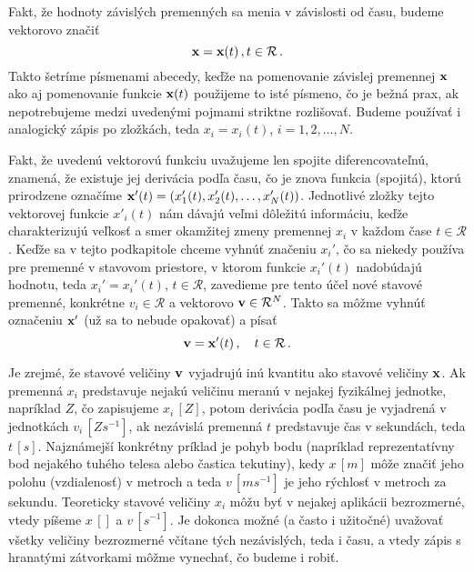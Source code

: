 Fakt, že hodnoty závislých premenných sa menia v závislosti od času, budeme vektorovo značiť
$$
{\bf x} = {\bf x}(t) \,, t \in \mathcal{R} \,.
$$
Takto šetríme písmenami abecedy, keďže na pomenovanie závislej premennej ${\bf x}$ ako aj pomenovanie funkcie ${\bf x}(t)$ použijeme to isté písmeno, čo je bežná prax, ak nepotrebujeme medzi uvedenými pojmami striktne rozlišovať. Budeme používať i analogický zápis po zložkách, teda $x_i=x_i(t)$, $i=1,2,\ldots,N$.

Fakt, že uvedenú vektorovú funkciu uvažujeme len spojite diferencovateľnú, znamená, že existuje jej derivácia podľa času, čo je znova funkcia (spojitá), ktorú prirodzene označíme ${\bf x}'(t)=(x_1'(t),x_2'(t),\ldots,x_N'(t))$. Jednotlivé zložky tejto vektorovej funkcie $x'_i(t)$ nám dávajú veľmi dôležitú informáciu, keďže charakterizujú veľkosť a smer okamžitej zmeny premennej $x_i$ v každom čase $t \in \mathcal{R}$. Keďže sa v tejto podkapitole chceme vyhnúť značeniu $x_i'$, čo sa niekedy používa pre premenné v stavovom priestore, v ktorom funkcie $x_i'(t)$ nadobúdajú hodnotu, teda $x_i'=x_i'(t)$, $t \in {\mathcal R}$, zavedieme pre tento účel nové stavové premenné, konkrétne $v_i \in {\mathcal R}$ a vektorovo ${\bf v} \in {\mathcal R}^N$. Takto sa môžme vyhnúť označeniu ${\bf x}'$ (už sa to nebude opakovať) a písať
\begin{equation}
\label{v=x}
{\bf v}  = {\bf x}'(t) \,, \quad t \in \mathcal{R} \,.
\end{equation}

Je zrejmé, že stavové veličiny ${\bf v}$ vyjadrujú inú kvantitu ako stavové veličiny $\bf x$.
Ak premenná $x_i$ predstavuje nejakú veličinu meranú v nejakej fyzikálnej jednotke, napríklad $Z$, čo zapisujeme $x_i \, [Z]$, potom derivácia podľa času je vyjadrená v jednotkách $v_i \, [Z s^{-1}]$, ak nezávislá premenná $t$ predstavuje čas v sekundách, teda $t \,[s]$.  Najznámejší konkrétny príklad je pohyb bodu (napríklad reprezentatívny bod nejakého tuhého telesa alebo častica tekutiny), kedy ${x} \, [m]$ môže značiť jeho polohu (vzdialenosť) v metroch a teda ${v} \, [m s^{-1}]$ je jeho rýchlosť v metroch za sekundu. Teoreticky stavové veličiny $x_i$ môžu byť v nejakej aplikácii bezrozmerné, vtedy píšeme $x \, []$ a ${v} \, [s^{-1}]$. Je dokonca možné (a často i užitočné) uvažovať všetky veličiny bezrozmerné včítane tých nezávislých, teda i času, a vtedy zápis s hranatými zátvorkami môžme vynechať, čo budeme i robiť.

